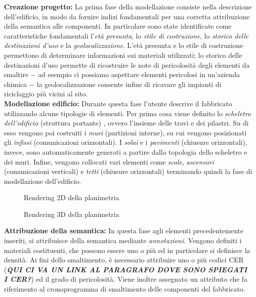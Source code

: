 \noindent \textbf{Creazione progetto:} La prima fase della modellazione consiste nella descrizione dell'edificio, in modo da fornire indizi fondamentali per una corretta attribuzione della semantica alle componenti. In particolare sono state identificate come caratteristiche fondamentali l'\textit{et\`a presunta}, lo \textit{stile di costruzione}, lo \textit{storico delle destinazioni d'uso} e la \textit{geolocalizzazione}. L'et\`a presunta e lo stile di costruzione permettono di determinare informazioni sui materiali utilizzati; lo storico delle destinazioni d'uso permette di ricostruire le note di pericolosit\`a degli elementi da smaltire $-$ ad esempio ci possiamo aspettare elementi pericolosi in un'azienda chimica $-$ la geolocalizzazione consente infine di ricavare gli impianti di riciclaggio pi\`u vicini al sito.\\

\noindent \textbf{Modellazione edificio:} Durante questa fase l'utente descrive il fabbricato utilizzando alcune tipologie di elementi. Per prima cosa viene definito lo \textit{scheletro dell'edificio} (struttura portante) , ovvero l'insieme delle travi e dei pilastri. Su di esso vengono poi costruiti i \textit{muri} (partizioni interne), su cui vengono posizionati gli \textit{infissi} (comunicazioni orizzontali). I \textit{solai} e i \textit{pavimenti} (chiusure orizzontali), invece, sono automaticamente generati a partire dalla topologia dello scheletro e dei muri. Infine, vengono collocati vari elementi come \textit{scale}, \textit{ascensori} (comunicazioni verticali) e \textit{tetti} (chiusure orizzontali) terminando quindi la fase di modellazione dell'edificio.

\begin{figure}[!h]
  \centering
   {}
  \caption{Rendering 2D della planimetria}
  \label{fig:example1}
\end{figure}

\begin{figure}[!h]
  \centering
   {}
  \caption{Rendering 3D della planimetria}
  \label{fig:example1}
\end{figure}


\noindent \textbf{Attribuzione della semantica:} In questa fase agli elementi precedentemente inseriti, si attribuisce della semantica mediante \textit{annotazioni}. Vengono definiti i materiali costituenti, che possono essere uno o pi\`u ed in particolare si definisce la densit\`a. Ai fini dello smaltimento, \`e necessario attribuire uno o pi\`u codici CER (\textbf{\textit{QUI CI VA UN LINK AL PARAGRAFO DOVE SONO SPIEGATI I CER?}}) ed il grado di pericolosit\`a. Viene inoltre assegnato un attributo che fa riferimento al cronoprogramma di smaltimento delle componenti del fabbricato.\\

